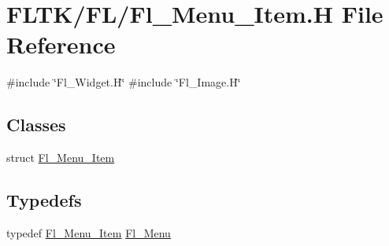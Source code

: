 \hypertarget{_fl___menu___item_8_h}{}\section{F\+L\+T\+K/\+F\+L/\+Fl\+\_\+\+Menu\+\_\+\+Item.H File Reference}
\label{_fl___menu___item_8_h}
{\ttfamily \#include \char`\"{}Fl\+\_\+\+Widget.\+H\char`\"{}}\newline
{\ttfamily \#include \char`\"{}Fl\+\_\+\+Image.\+H\char`\"{}}\newline
\subsection*{Classes}
\begin{DoxyCompactItemize}
\item 
struct \hyperlink{struct_fl___menu___item}{Fl\+\_\+\+Menu\+\_\+\+Item}
\end{DoxyCompactItemize}
\subsection*{Typedefs}
\begin{DoxyCompactItemize}
\item 
typedef \hyperlink{struct_fl___menu___item}{Fl\+\_\+\+Menu\+\_\+\+Item} \hyperlink{_fl___menu___item_8_h_a5d62cb6d3879dca9d132cee821d54896}{Fl\+\_\+\+Menu}
\end{DoxyCompactItemize}
